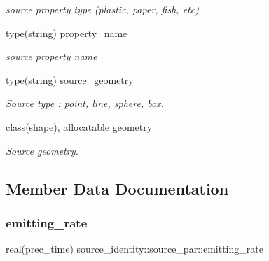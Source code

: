 \begin{DoxyCompactItemize}
\begin{DoxyCompactList}\small\item\em source property type (plastic, paper, fish, etc) \end{DoxyCompactList}\item 
type(string) \hyperlink{structsource__identity_1_1source__par_a0205c62b7673e76c7f1de2bfcecabd84}{property\+\_\+name}
\begin{DoxyCompactList}\small\item\em source property name \end{DoxyCompactList}\item 
type(string) \hyperlink{structsource__identity_1_1source__par_a088f264b78200deb737b873025837ec6}{source\+\_\+geometry}
\begin{DoxyCompactList}\small\item\em Source type \+: \textquotesingle{}point\textquotesingle{}, \textquotesingle{}line\textquotesingle{}, \textquotesingle{}sphere\textquotesingle{}, \textquotesingle{}box\textquotesingle{}. \end{DoxyCompactList}\item 
class(\hyperlink{structgeometry_1_1shape}{shape}), allocatable \hyperlink{structsource__identity_1_1source__par_a96d4d1aebbc4cf365220f0bf0eabca97}{geometry}
\begin{DoxyCompactList}\small\item\em Source geometry. \end{DoxyCompactList}\end{DoxyCompactItemize}


\subsection{Member Data Documentation}
\mbox{\label{structsource__identity_1_1source__par_a746a02960ffcba9f699ae45fa55dd8b4}} 
\subsubsection{\texorpdfstring{emitting\+\_\+rate}{emitting\_rate}}
{\footnotesize\ttfamily real(prec\+\_\+time) source\+\_\+identity\+::source\+\_\+par\+::emitting\+\_\+rate\hspace{0.3cm}{\ttfamily [private]}}



